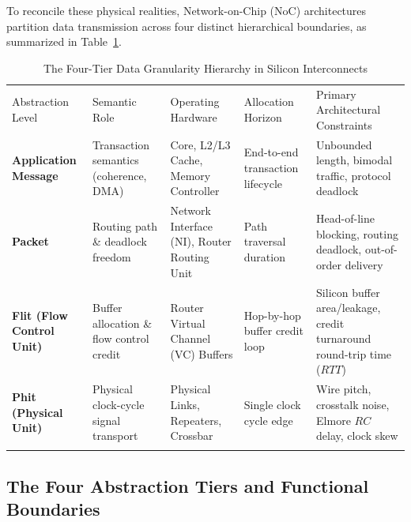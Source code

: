 To reconcile these physical realities, Network-on-Chip (NoC) architectures partition data transmission across four distinct hierarchical boundaries, as summarized in Table~\ref{tab:ch2_granularity_taxonomy}.

\begin{table}[t]
\caption{The Four-Tier Data Granularity Hierarchy in Silicon Interconnects}
\label{tab:ch2_granularity_taxonomy}
\begin{tabular}{p{2.0cm}p{2.2cm}p{2.2cm}p{2.2cm}p{2.8cm}}
\hline\noalign{\smallskip}
Abstraction Level & Semantic Role & Operating Hardware & Allocation Horizon & Primary Architectural Constraints \\
\noalign{\smallskip}\svhline\noalign{\smallskip}
\textbf{Application Message} & Transaction semantics (coherence, DMA) & Core, L2/L3 Cache, Memory Controller & End-to-end transaction lifecycle & Unbounded length, bimodal traffic, protocol deadlock \\
\textbf{Packet} & Routing path \& deadlock freedom & Network Interface (NI), Router Routing Unit & Path traversal duration & Head-of-line blocking, routing deadlock, out-of-order delivery \\
\textbf{Flit (Flow Control Unit)} & Buffer allocation \& flow control credit & Router Virtual Channel (VC) Buffers & Hop-by-hop buffer credit loop & Silicon buffer area/leakage, credit turnaround round-trip time ($RTT$) \\
\textbf{Phit (Physical Unit)} & Physical clock-cycle signal transport & Physical Links, Repeaters, Crossbar & Single clock cycle edge & Wire pitch, crosstalk noise, Elmore $RC$ delay, clock skew \\
\noalign{\smallskip}\hline\noalign{\smallskip}
\end{tabular}
\end{table}

\subsection{The Four Abstraction Tiers and Functional Boundaries}
\label{subsec:ch2_four_tiers}

